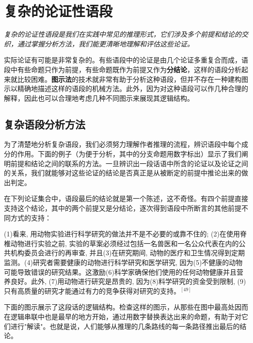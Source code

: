 \section{复杂的论证性语段}

\begin{logicbox}[title=引言]
\textit{复杂的论证性语段是我们在实践中常见的推理形式，它们涉及多个前提和结论的交织，通过掌握分析方法，我们能更清晰地理解和评估这些论证。}
\end{logicbox}

实际论证有可能是非常复杂的。有些语段中的论证是由几个论证多重复合而成，语段中有些命题只作为前提，有些命题既作为前提又作为\textbf{分结论}，这样的语段分析起来就比较困难。\textbf{图示法}的技术就非常有助于分析这种语段，但并不存在一种建构图示以精确地描述这样的语段的机械方法。此外，因为对这种语段可以作几种合理的解释，因此也可以合理地考虑几种不同图示来展现其逻辑结构。

\subsection{复杂语段分析方法}

为了清楚地分析复杂语段，我们必须努力理解作者推理的流程，辨识语段中每个成分的作用。下面的例子（为便于分析，其中的分支命题用数字标出）显示了我们阐明前提和结论之间的联系的方法。一旦辨识出一段话语中所含的论证以及论证之间的关系，我们就能够对这些论证的结论是否真正是从被断定的前提中推论出来的做出判定。

在下列论证集合中，语段最后的结论就是第一个陈述，这不奇怪。有四个前提直接支持这个结论，其中的两个前提又是分结论，逐次得到语段中所断言的其他前提不同方式的支持：

\begin{displayquote}
(1)看来, 用动物实验进行科学研究的做法并不是不必要的或靠不住的; (2)在使用脊椎动物进行实验之前, 实验的草案必须经过包括一名兽医和一名公众代表在内的公共机构委员会进行的再审查, 并且(3)在研究期间, 动物的医疗和卫生情况得到定期监测。(4)研究者需要健康的动物进行科学研究和医学研究, 因为(5)不健康的动物可能导致错误的研究结果。这激励(6)科学家确保他们使用的任何动物健康并且营养良好。此外, (7)用动物进行研究是昂贵的, 因为(8)料学研究的资金受到限制, (9)只有高质量的研究才能通过有力的竞争获得对研究的支持。$^{[49]}$
\end{displayquote}

下面的图示展示了这段话的逻辑结构。检查这样的图示，从那些在图中最高处因而在逻辑串联中也是最早的地方开始，通过用数字替换表达出来的命题，有助于对它们进行"解读"。也就是说，人们能够从推理的几条路线的每一条路径推出最后的结论。

